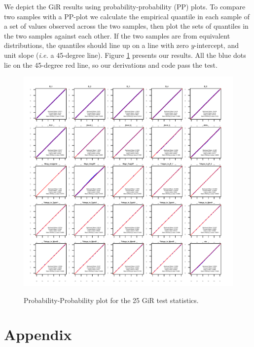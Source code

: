 \documentclass[a4paper]{article}
\begin{document}
We depict the GiR results using probability-probability (PP) plots. To compare two samples with a PP-plot we calculate the empirical quantile in each sample of a set of values observed across the two samples, then plot the sets of quantiles in the two samples against each other. If the two samples are from equivalent distributions, the quantiles should line up on a line with zero $y$-intercept, and unit slope (\textit{i.e.} a 45-degree line). Figure \ref{fig:PPplot2} presents our results. All the blue dots lie on the
45-degree red line, so our derivations and code pass the test.
\begin{figure}[H]
	\centering
	\includegraphics[width=1.1\textwidth]{plots/GiReta.pdf} 
	\label{fig:PPplot2}
	\caption{Probability-Probability plot for the 25 GiR test statistics.}
\end{figure}


\appendix
 \section*{Appendix}
 \renewcommand{\thesubsection}{\Alph{subsection}}
\end{document}
